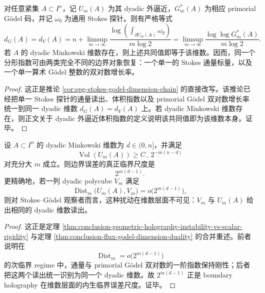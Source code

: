 \begin{theorem}\label{thm:conclusion-flux-godel-dimension-duality}
对任意紧集 \(A\subset I^n\)，记 \(U_m(A)\) 为其 dyadic 外逼近，\(G_m^\ast(A)\) 为相应 primorial Gödel 码，并记 \(\omega_0\) 为通用 Stokes 探针。则有严格等式
\[
d_G(A)=d_V(A)
=
n+\limsup_{m\to\infty}\frac{\log\!\left(\int_{\partial U_m(A)}\omega_0\right)}{m\log 2}
=
\limsup_{m\to\infty}\frac{\log\log G_m^\ast(A)}{m\log 2}.
\]
若 \(A\) 的 dyadic Minkowski 维数存在，则上述共同值即等于该维数。因而，同一个分形指数可由两类完全不同的边界对象恢复：一个单一的 Stokes 通量标量，以及一个单一算术 Gödel 整数的双对数增长率。
\end{theorem}
\begin{proof}
这正是推论 \ref{cor:spg-stokes-godel-dimension-chain} 的直接改写。该推论已经把单一 Stokes 探针的通量读出、体积指数以及 primorial Gödel 双对数增长率统一到同一 dyadic 维数 \(d_G(A)=d_V(A)\) 上。若 dyadic Minkowski 维数存在，则正文关于 dyadic 外逼近体积指数的定义说明该共同值即为该维数本身。证毕。
\end{proof}

\begin{corollary}[边界全息的临界误差阈值]\label{cor:conclusion-boundary-holography-critical-error-threshold}
设 \(A\subset I^n\) 的 dyadic Minkowski 维数为 \(d\in(0,n]\)，并满足
\[
\operatorname{Vol}(U_m(A))\ge C_-\,2^{-m(n-d)}
\]
对充分大 \(m\) 成立。则边界误差的真正临界尺度是
\[
2^{m(d-1)}.
\]
更精确地，若一列 dyadic polycube \(V_m\) 满足
\[
\operatorname{Dist}_m\bigl(U_m(A),V_m\bigr)=o\!\bigl(2^{m(d-1)}\bigr),
\]
则对 Stokes--Gödel 观察者而言，这种扰动在维数层面不可见：\(V_m\) 与 \(U_m(A)\) 给出相同的 dyadic 维数读出。
\end{corollary}
\begin{proof}
这正是定理 \ref{thm:conclusion-geometric-holography-instability-vs-scalar-rigidity} 与定理 \ref{thm:conclusion-flux-godel-dimension-duality} 的合并重述。前者说明在
\[
\operatorname{Dist}_m=o\!\bigl(2^{m(d-1)}\bigr)
\]
的次临界 regime 中，通量与 primorial Gödel 双对数的一阶指数保持刚性；后者把这两个读出统一识别为同一个 dyadic 维数。故 \(2^{m(d-1)}\) 正是 boundary holography 在维数层面的内生临界误差尺度。证毕。
\end{proof}

